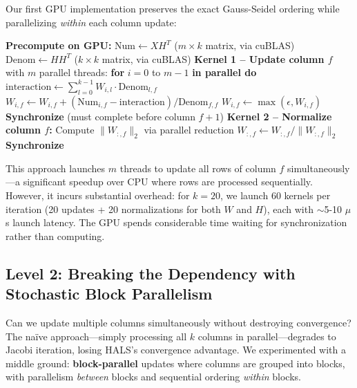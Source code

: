 \documentclass[11pt]{article}
\begin{document}
Our first GPU implementation preserves the exact Gauss-Seidel ordering while parallelizing \textit{within} each column update:

\begin{algorithm}[H]
\caption{HALS GPU Strict: Preserve Sequential Ordering}
\begin{algorithmic}
\STATE \textbf{Precompute on GPU:}
\STATE \quad $\text{Num} \leftarrow XH^T$ \quad ($m \times k$ matrix, via cuBLAS)
\STATE \quad $\text{Denom} \leftarrow HH^T$ \quad ($k \times k$ matrix, via cuBLAS)
\STATE
{}
    \STATE \textbf{Kernel 1 -- Update column $f$} with $m$ parallel threads:
    \STATE \quad \textbf{for} $i = 0$ to $m-1$ \textbf{in parallel do}
    \STATE \quad \quad $\text{interaction} \leftarrow \sum_{l=0}^{k-1} W_{i,l} \cdot \text{Denom}_{l,f}$
    \STATE \quad \quad $W_{i,f} \leftarrow W_{i,f} + (\text{Num}_{i,f} - \text{interaction}) / \text{Denom}_{f,f}$
    \STATE \quad \quad $W_{i,f} \leftarrow \max(\epsilon, W_{i,f})$
    \STATE \textbf{Synchronize} (must complete before column $f+1$)
    \STATE
    \STATE \textbf{Kernel 2 -- Normalize column $f$:}
    \STATE \quad Compute $\|W_{:,f}\|_2$ via parallel reduction
    \STATE \quad $W_{:,f} \leftarrow W_{:,f} / \|W_{:,f}\|_2$
    \STATE \textbf{Synchronize}
\ENDFOR
\end{algorithmic}
\end{algorithm}

This approach launches $m$ threads to update all rows of column $f$ simultaneously---a significant speedup over CPU where rows are processed sequentially. However, it incurs substantial overhead: for $k=20$, we launch 60 kernels per iteration (20 updates + 20 normalizations for both $W$ and $H$), each with $\sim$5-10 $\mu$s launch latency. The GPU spends considerable time waiting for synchronization rather than computing.

\subsection{Level 2: Breaking the Dependency with Stochastic Block Parallelism}

Can we update multiple columns simultaneously without destroying convergence? The na\"ive approach---simply processing all $k$ columns in parallel---degrades to Jacobi iteration, losing HALS's convergence advantage. We experimented with a middle ground: \textbf{block-parallel} updates where columns are grouped into blocks, with parallelism \textit{between} blocks and sequential ordering \textit{within} blocks.
\end{document}
